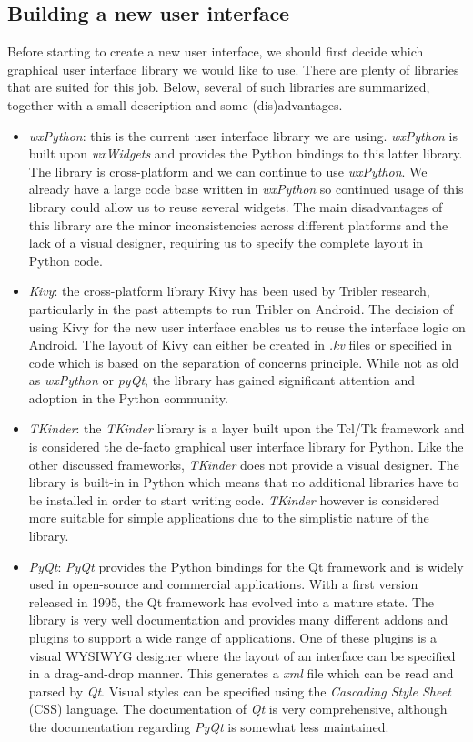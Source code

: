 \subsection{Building a new user interface}
Before starting to create a new user interface, we should first decide which graphical user interface library we would like to use. There are plenty of libraries that are suited for this job. Below, several of such libraries are summarized, together with a small description and some (dis)advantages.
\begin{itemize}
	\item \emph{wxPython}: this is the current user interface library we are using. \emph{wxPython} is built upon \emph{wxWidgets} and provides the Python bindings to this latter library. The library is cross-platform and we can continue to use \emph{wxPython}. We already have a large code base written in \emph{wxPython} so continued usage of this library could allow us to reuse several widgets. The main disadvantages of this library are the minor inconsistencies across different platforms and the lack of a visual designer, requiring us to specify the complete layout in Python code.
	\item \emph{Kivy}: the cross-platform library Kivy has been used by Tribler research, particularly in the past attempts to run Tribler on Android\cite{de2014android}\cite{sabee2014tribler}. The decision of using Kivy for the new user interface enables us to reuse the interface logic on Android. The layout of Kivy can either be created in \emph{.kv} files or specified in code which is based on the separation of concerns principle. While not as old as \emph{wxPython} or \emph{pyQt}, the library has gained significant attention and adoption in the Python community.
	\item \emph{TKinder}: the \emph{TKinder} library is a layer built upon the Tcl/Tk framework and is considered the de-facto graphical user interface library for Python. Like the other discussed frameworks, \emph{TKinder} does not provide a visual designer. The library is built-in in Python which means that no additional libraries have to be installed in order to start writing code. \emph{TKinder} however is considered more suitable for simple applications due to the simplistic nature of the library.
	\item \emph{PyQt}: \emph{PyQt} provides the Python bindings for the Qt framework and is widely used in open-source and commercial applications. With a first version released in 1995, the Qt framework has evolved into a mature state. The library is very well documentation and provides many different addons and plugins to support a wide range of applications. One of these plugins is a visual WYSIWYG designer where the layout of an interface can be specified in a drag-and-drop manner. This generates a \emph{xml} file which can be read and parsed by \emph{Qt}. Visual styles can be specified using the  \emph{Cascading Style Sheet} (CSS) language. The documentation of \emph{Qt} is very comprehensive, although the documentation regarding \emph{PyQt} is somewhat less maintained.
\end{itemize}

